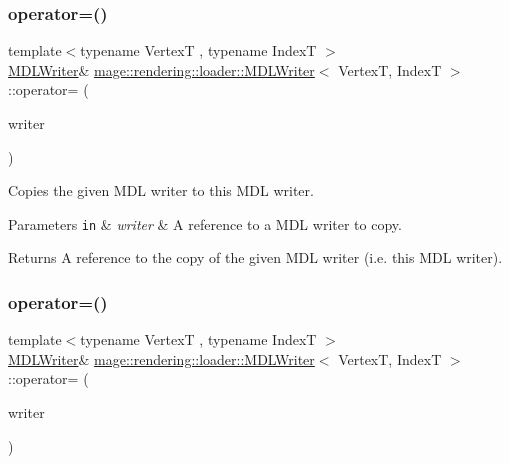 \subsubsection{\texorpdfstring{operator=()}{operator=()}\hspace{0.1cm}{\footnotesize\ttfamily [1/2]}}
{\footnotesize\ttfamily template$<$typename VertexT , typename IndexT $>$ \\
\mbox{\hyperlink{classmage_1_1rendering_1_1loader_1_1_m_d_l_writer}{M\+D\+L\+Writer}}\& \mbox{\hyperlink{classmage_1_1rendering_1_1loader_1_1_m_d_l_writer}{mage\+::rendering\+::loader\+::\+M\+D\+L\+Writer}}$<$ VertexT, IndexT $>$\+::operator= (\begin{DoxyParamCaption}\item[{const \mbox{\hyperlink{classmage_1_1rendering_1_1loader_1_1_m_d_l_writer}{M\+D\+L\+Writer}}$<$ VertexT, IndexT $>$ \&}]{writer }\end{DoxyParamCaption})\hspace{0.3cm}{\ttfamily [delete]}}

Copies the given M\+DL writer to this M\+DL writer.


\begin{DoxyParams}[1]{Parameters}
\mbox{\tt in}  & {\em writer} & A reference to a M\+DL writer to copy. \\
\hline
\end{DoxyParams}
\begin{DoxyReturn}{Returns}
A reference to the copy of the given M\+DL writer (i.\+e. this M\+DL writer). 
\end{DoxyReturn}
\mbox{\label{classmage_1_1rendering_1_1loader_1_1_m_d_l_writer_aaa2a3f4e8025bffefefaae7d3ef018f0}} 
\subsubsection{\texorpdfstring{operator=()}{operator=()}\hspace{0.1cm}{\footnotesize\ttfamily [2/2]}}
{\footnotesize\ttfamily template$<$typename VertexT , typename IndexT $>$ \\
\mbox{\hyperlink{classmage_1_1rendering_1_1loader_1_1_m_d_l_writer}{M\+D\+L\+Writer}}\& \mbox{\hyperlink{classmage_1_1rendering_1_1loader_1_1_m_d_l_writer}{mage\+::rendering\+::loader\+::\+M\+D\+L\+Writer}}$<$ VertexT, IndexT $>$\+::operator= (\begin{DoxyParamCaption}\item[{\mbox{\hyperlink{classmage_1_1rendering_1_1loader_1_1_m_d_l_writer}{M\+D\+L\+Writer}}$<$ VertexT, IndexT $>$ \&\&}]{writer }\end{DoxyParamCaption})\hspace{0.3cm}{\ttfamily [delete]}}

